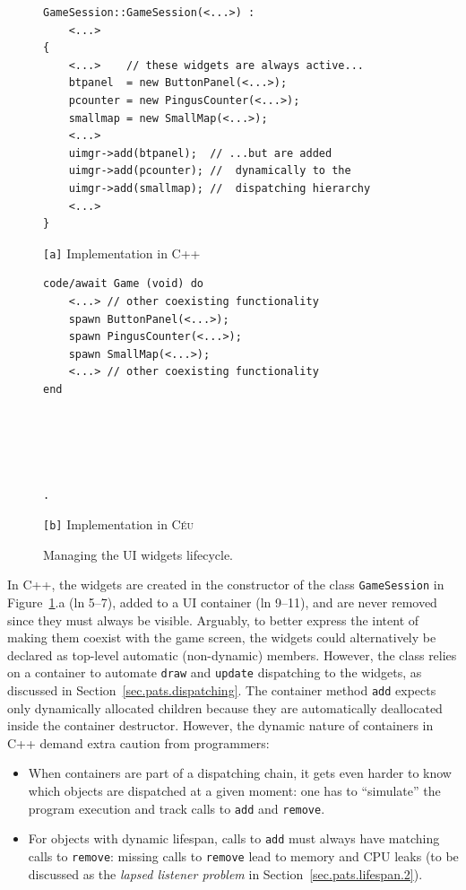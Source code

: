 \documentclass[10pt, conference, compsocconf]{IEEEtran}
\newcommand{\CEU}{\textsc{C\'{e}u}\xspace}
\newcommand{\code}[1] {{\small{\texttt{#1}}}}
\newcommand{\ax}{\code{[a]}\xspace}
\newcommand{\bx}{\code{[b]}\xspace}
\begin{document}
\begin{figure}
\begin{minipage}[t]{0.50\linewidth}
\begin{lstlisting}[numbers=right]
GameSession::GameSession(<...>) :
    <...>
{
    <...>    // these widgets are always active...
    btpanel  = new ButtonPanel(<...>);
    pcounter = new PingusCounter(<...>);
    smallmap = new SmallMap(<...>);
    <...>
    uimgr->add(btpanel);  // ...but are added
    uimgr->add(pcounter); //  dynamically to the
    uimgr->add(smallmap); //  dispatching hierarchy
    <...>
}
\end{lstlisting}
\centering\small{\ax Implementation in C++}
\end{minipage}
%
\begin{minipage}[t]{0.50\linewidth}
\begin{lstlisting}[xleftmargin=2em]
code/await Game (void) do
    <...> // other coexisting functionality
    spawn ButtonPanel(<...>);
    spawn PingusCounter(<...>);
    spawn SmallMap(<...>);
    <...> // other coexisting functionality
end





.
\end{lstlisting}
\centering\small{\bx Implementation in \CEU}
\end{minipage}
\caption{ Managing the UI widgets lifecycle.
\label{lst.ui}
}
\end{figure}

In C++, the widgets are created in the constructor of the class
\code{GameSession} in Figure~\ref{lst.ui}.a (ln 5--7), added to a UI container
(ln 9--11), and are never removed since they must always be visible.
Arguably, to better express the intent of making them coexist with the game
screen, the widgets could alternatively be declared as top-level automatic
(non-dynamic) members.
However, the class relies on a container to automate \code{draw} and
\code{update} dispatching to the widgets, as discussed in
Section~\ref{sec.pats.dispatching}.
The container method \code{add} expects only dynamically allocated children
because they are automatically deallocated inside the container destructor.
%
However, the dynamic nature of containers in C++ demand extra caution from
programmers:
%
\begin{itemize}
\item When containers are part of a dispatching chain, it gets even harder to
      know which objects are dispatched at a given moment:
      one has to ``simulate'' the program execution and track calls to
      \code{add} and \code{remove}.
\item For objects with dynamic lifespan, calls to \code{add} must always have
      matching calls to \code{remove}:
      missing calls to \code{remove} lead to memory and CPU leaks (to be
      discussed as the \emph{lapsed listener problem} in
      Section~\ref{sec.pats.lifespan.2}).
\end{itemize}
\end{document}
